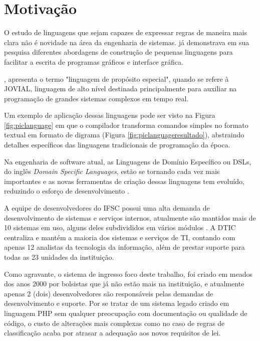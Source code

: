 \section{Motivação}
\label{motivacao}

O estudo de linguagens que sejam capazes de expressar regras de maneira mais clara não é novidade na área da engenharia de sistemas.  já demonstrava em sua pesquisa diferentes abordagens de construção de pequenas linguagens para facilitar a escrita de programas gráficos e interface gráfica.


, apresenta o termo "linguagem de propósito especial", quando se refere à \gls{JOVIAL}, linguagem de alto nível destinada principalmente para auxiliar na programação de grandes sistemas complexos em tempo real. 

Um exemplo de aplicação dessas linguagens pode ser visto na Figura \ref{fig:piclanguage} em que o compilador transforma comandos simples no formato textual em formato de digrama (Figura \ref{fig:piclanguageresultado}), abstraindo detalhes específicos das linguagens tradicionais de programação da época.




Na engenharia de software atual, as Linguagens de Domínio Específico ou DSLs, do inglês \textit{Domain Specific Languages}, estão se tornando cada vez mais importantes e as novas ferramentas de criação dessas linguagens tem evoluído, reduzindo o esforço de desenvolvimento \cite{dslengineering}.

A equipe de desenvolvedores do \gls{IFSC} possui uma alta demanda de desenvolvimento de sistemas e serviços internos, atualmente são mantidos mais de 10 sistemas em uso, alguns deles subdivididos em vários módulos \cite{catalogoifsc}. A \gls{DTIC} centraliza e mantém a maioria dos sistemas e serviços de TI, contando com apenas 12 analistas da tecnologia da informação, além de prestar suporte para todas as 23 unidades da instituição. 

Como agravante, o sistema de ingresso foco deste trabalho, foi criado em meados dos anos 2000 por bolsistas que já não estão mais na instituição, e atualmente apenas 2 (dois) desenvolvedores são responsáveis pelas demandas de desenvolvimento e suporte. Por se tratar de um sistema legado criado em linguagem PHP sem qualquer preocupação com documentação ou qualidade de código, o custo de alterações mais complexas como no caso de regras de classificação acaba por atrasar a adequação aos novos requisitos de lei. 

